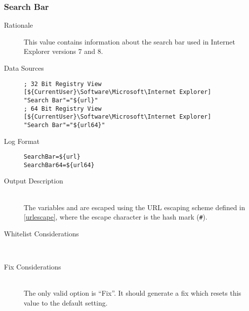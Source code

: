 \subsubsection{Search Bar}
\begin{description}
\item[Rationale] This value contains information about the search bar used in
Internet Explorer versions 7 and 8.

\item[Data Sources] \hfill
\vspace{-\baselineskip}
\begin{verbatim}
; 32 Bit Registry View
[${CurrentUser}\Software\Microsoft\Internet Explorer]
"Search Bar"="${url}"
; 64 Bit Registry View
[${CurrentUser}\Software\Microsoft\Internet Explorer]
"Search Bar"="${url64}"
\end{verbatim}
\item[Log Format] \hfill
\vspace{-\baselineskip}
\begin{verbatim} 
SearchBar=${url}
SearchBar64=${url64}
\end{verbatim}
\item[Output Description] \hfill \\
The variables  and  are escaped using the URL escaping
scheme defined in \ref{urlescape}, where the escape character is the hash mark
(\verb|#|).
\item[Whitelist Considerations] \hfill \\

\item[Fix Considerations] \hfill \\
The only valid option is ``Fix''. It should generate a fix which resets this
value to the default setting.
\end{description}

